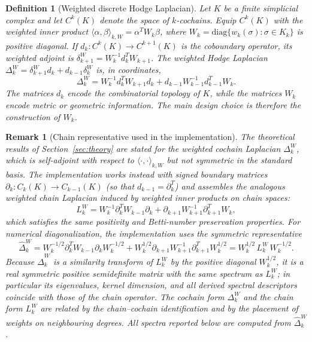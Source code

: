 \documentclass[11pt]{amsart}
\theoremstyle{plain}
\newtheorem{definition}[theorem]{Definition}
\newtheorem{remark}[theorem]{Remark}
\begin{document}
\begin{definition}[Weighted discrete Hodge Laplacian]
Let $K$ be a finite simplicial complex and let $C^k(K)$ denote the space of $k$-cochains. Equip
$C^k(K)$ with the weighted inner product
$\langle \alpha,\beta\rangle_{k,W}=\alpha^T W_k\beta$, where
$W_k=\mathrm{diag}\{w_k(\sigma):\sigma\in K_k\}$ is positive diagonal. If
$d_k:C^k(K)\to C^{k+1}(K)$ is the coboundary operator, its weighted adjoint is
$\delta_{k+1}^{W}=W_k^{-1}d_k^T W_{k+1}$. The weighted Hodge Laplacian
$\Delta_k^W=\delta_{k+1}^{W}d_k+d_{k-1}\delta_k^W$ is, in coordinates,
\[
\Delta_k^W
=
W_k^{-1}d_k^T W_{k+1}d_k
+
d_{k-1}W_{k-1}^{-1}d_{k-1}^T W_k.
\]
The matrices $d_k$ encode the combinatorial topology of $K$, while the matrices $W_k$ encode
metric or geometric information. The main design choice is therefore the construction of $W_k$.
\end{definition}

\begin{remark}[Chain representative used in the implementation]
The theoretical results of Section~\ref{sec:theory} are stated for the weighted cochain Laplacian
$\Delta_k^W$, which is self-adjoint with respect to $\langle\cdot,\cdot\rangle_{k,W}$ but not
symmetric in the standard basis. The implementation works instead with signed boundary matrices
$\partial_k:C_k(K)\to C_{k-1}(K)$ (so that $d_{k-1}=\partial_k^T$) and assembles the analogous
weighted chain Laplacian induced by weighted inner products on chain spaces:
\[
L_k^W
=
W_k^{-1}\partial_k^T W_{k-1}\partial_k
+
\partial_{k+1}W_{k+1}^{-1}\partial_{k+1}^T W_k,
\]
which satisfies the same positivity and Betti-number preservation properties. For numerical
diagonalization, the implementation uses the symmetric representative
\[
\widehat{\Delta}_k^W
=
W_k^{-1/2}\partial_k^T W_{k-1}\partial_k W_k^{-1/2}
+
W_k^{1/2}\partial_{k+1}W_{k+1}^{-1}\partial_{k+1}^T W_k^{1/2}
=
W_k^{1/2}\,L_k^W\,W_k^{-1/2}.
\]
Because $\widehat{\Delta}_k^W$ is a similarity transform of $L_k^W$ by the positive diagonal
$W_k^{1/2}$, it is a real symmetric positive semidefinite matrix with the same spectrum as
$L_k^W$; in particular its eigenvalues, kernel dimension, and all derived spectral descriptors
coincide with those of the chain operator. The cochain form $\Delta_k^W$ and the chain form $L_k^W$
are related by the chain--cochain identification and by the placement of weights on neighbouring
degrees. All spectra reported below are computed from $\widehat{\Delta}_k^W$.
\end{remark}
\end{document}
